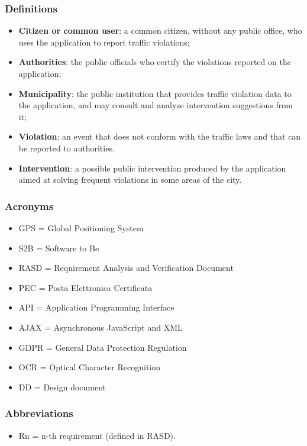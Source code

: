 \subsubsection{Definitions}
\begin{itemize}
	\item \textbf{Citizen or common user}: a common citizen, without any public office, who uses the application to report traffic violations;
	\item \textbf{Authorities}: the public officials who certify the violations reported on the application;
	\item \textbf{Municipality}: the public institution that provides traffic violation data to the application, and may consult and analyze intervention suggestions from it;
	\item \textbf{Violation}: an event that does not conform with the traffic laws and that can be reported to authorities.
	\item \textbf{Intervention}: a possible public intervention produced by the application aimed at solving frequent violations in some areas of the city.
\end{itemize}
\subsubsection{Acronyms}
\begin{itemize}
	\item GPS = Global Positioning System
	\item S2B = Software to Be
	\item RASD = Requirement Analysis and Verification Document
	\item PEC = Posta Elettronica Certificata
	\item API = Application Programming Interface
	\item AJAX = Asynchronous JavaScript and XML
	\item GDPR = General Data Protection Regulation
	\item OCR = Optical Character Recognition
	\item DD = Design document
\end{itemize}
\subsubsection{Abbreviations}
\begin{itemize}
	\item Rn = n-th requirement (defined in RASD).
\end{itemize}